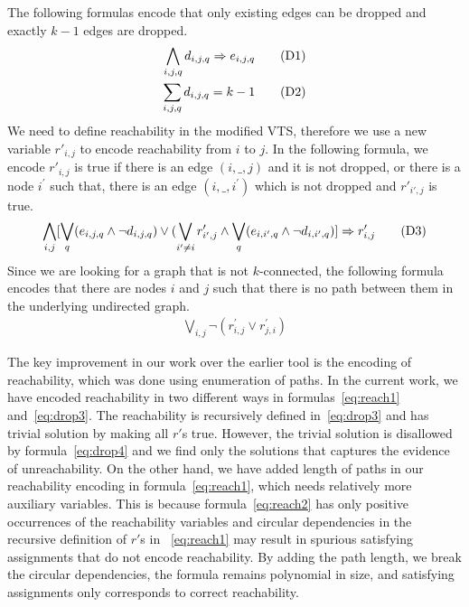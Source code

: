 The following formulas encode that only existing edges can be dropped
and exactly $k-1$ edges are dropped.
\begin{align}
  \bigwedge\limits_{i,j,q} d_{i,j,q} \Rightarrow e_{i,j,q}  \tag{D1}\label{eq:drop1}\\
  \sum_{i,j,q} d_{i,j,q} = k-1
  \tag{D2}\label{eq:drop2}
\end{align}
We need to define reachability in the modified VTS, therefore we use
a new variable $r'_{i,j}$ to encode reachability from $i$ to $j$.
In the following formula, we encode $r'_{i,j}$ is true if there is an
edge $(i,\_,j)$ and it is not dropped, or there is a node
$i^{\prime}$ such that, there is an edge $(i,\_,i^{\prime})$ which is
not dropped and $r'_{i',j}$ is true.
\begin{align}
\bigwedge\limits_{i,j}  [\bigvee_{q} (e_{i,j,q} \land  \neg d_{i,j,q}) \lor  (\bigvee_{i' \neq i}  r^{\prime}_{i',j} \land  \bigvee_{q} (e_{i,i',q} \land \neg d_{i,i',q}) ] \Rightarrow r^{\prime}_{i,j}  
  \tag{D3}\label{eq:drop3}
\end{align}
Since we are looking for a graph that is not $k$-connected,
the following formula encodes that there are nodes $i$ and $j$ such that
there is no path between them in the underlying undirected graph.
\begin{align}
   \bigvee\limits_{i,j} \neg (r^{\prime}_{i,j} \lor r^{\prime}_{j,i})
  \tag{D4}\label{eq:drop4}
\end{align}

The key improvement in our work over the earlier tool is the
encoding of reachability, which was done using enumeration of paths.
%
In the current work, we have encoded reachability in two different
ways in formulas~\eqref{eq:reach1} and~\eqref{eq:drop3}.
%
The reachability is recursively defined in~\eqref{eq:drop3} and has
trivial solution by making all $r'$s true.
%
However, the trivial solution is disallowed by formula~\eqref{eq:drop4} and we find
only the solutions that captures the evidence of unreachability.
%
On the other hand,
we have added length of paths in our reachability encoding in formula~\eqref{eq:reach1},
which needs relatively more auxiliary variables.
%
This is because formula~\eqref{eq:reach2} has only positive
occurrences of the reachability variables and circular dependencies in
the recursive definition of $r'$s in ~\eqref{eq:reach1} may result
in spurious satisfying assignments that do not encode reachability.
%
By adding the path length, we break the circular dependencies, the
formula remains polynomial in size, and satisfying assignments only
corresponds to correct reachability.

